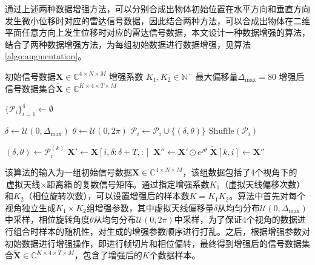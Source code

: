 通过上述两种数据增强方法，可以分别合成出物体初始位置在水平方向和垂直方向发生微小位移时对应的雷达信号数据，因此结合两种方法，可以合成出物体在二维平面任意方向上发生位移时对应的雷达信号数据，本文设计一种数据增强的算法，结合了两种数据增强方法，为每组初始数据进行数据增强，见算法\ref{algo:augmentation}。
\begin{algorithm}[H]
    \caption{数据增强算法}
    \label{algo:augmentation}
    \begin{algorithmic}[1]
        \Require
        \Statex 初始信号数据$\mathbf{X} \in \mathbb{C}^{4 \times N \times M}$ 
        \Statex  增强系数 $K_1, K_2 \in \mathbb{N}^+$ 
        \Statex 最大偏移量$\Delta_{\max} = 80$ 
        \Ensure 增强后信号数据集合$\mathbf{\tilde{X}} \in \mathbb{C}^{K\times 4 \times T \times M}$ 
        
            \State  $\{\mathcal{P}_i\}_{i=1}^4 \gets \emptyset$ 
            
             
                    \State $\delta \gets \mathcal{U}(0, \Delta_{\max})$ 
                        \State $\theta \gets \mathcal{U}(0, 2\pi)$ 
                        \State $\mathcal{P}_i \gets \mathcal{P}_i \cup \{(\delta, \theta)\}$
                    \EndFor
                \EndFor
                \State $\text{Shuffle}(\mathcal{P}_i)$ 
            \EndFor
        
             
                    \State  $(\delta, \theta) \gets \mathcal{P}_i^{(k)}$ 
                    \State $\mathbf{X}' \gets \mathbf{X}[i, \delta:\delta+T, :]$ 
                    \State $\mathbf{X}'' \gets \mathbf{X}'  \odot e^{j\theta}$ 
                    \State $\mathbf{\tilde{X}}[k,i] \gets \mathbf{X}''$
                \EndFor
            \EndFor
    \end{algorithmic}
\end{algorithm}
该算法的输入为一组初始信号数据$\mathbf{X} \in \mathbb{C}^{4 \times N \times M}$，该组数据包括了4个视角下的$\text{虚拟天线}\times\text{距离箱}$的复数信号矩阵。通过指定增强系数$K_1$（虚拟天线偏移次数）和$K_2$（相位旋转次数），可以设置增强后的样本数$K=K_1 K_2$。算法中首先对每个视角独立生成$K_1 \times K_2$组增强参数，其中虚拟天线偏移量$\delta$从均匀分布$\mathcal{U}(0, \Delta_{\max})$中采样，相位旋转角度$\theta$从均匀分布$\mathcal{U}(0, 2\pi)$中采样，为了保证4个视角的数据进行组合时样本的随机性，对生成的增强参数顺序进行打乱。之后，根据增强参数对初始数据进行增强操作，即进行帧切片和相位偏转，最终得到增强后的信号数据集合$\mathbf{\tilde{X}} \in \mathbb{C}^{K\times 4 \times T \times M}$，包含了增强后的$K$个数据样本。



